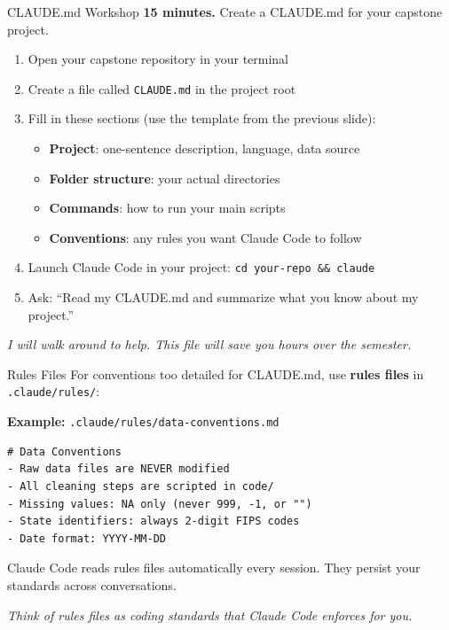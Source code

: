 \begin{frame}{CLAUDE.md Workshop}
  \textbf{\textcolor{usfgreen}{15 minutes.}} Create a CLAUDE.md for your capstone project.

  \vspace{6pt}

  \begin{enumerate}
    \item Open your capstone repository in your terminal
    \item Create a file called \texttt{CLAUDE.md} in the project root
    \item Fill in these sections (use the template from the previous slide):
    \begin{itemize}
      \item \textbf{Project}: one-sentence description, language, data source
      \item \textbf{Folder structure}: your actual directories
      \item \textbf{Commands}: how to run your main scripts
      \item \textbf{Conventions}: any rules you want Claude Code to follow
    \end{itemize}
    \item Launch Claude Code in your project: \texttt{cd your-repo \&\& claude}
    \item Ask: ``Read my CLAUDE.md and summarize what you know about my project.''
  \end{enumerate}

  \vspace{4pt}

  \textit{I will walk around to help. This file will save you hours over the semester.}
\end{frame}

\begin{frame}[fragile]{Rules Files}
  For conventions too detailed for CLAUDE.md, use \textbf{rules files} in \texttt{.claude/rules/}:

  \vspace{4pt}

  \textbf{Example:} \texttt{.claude/rules/data-conventions.md}

\begin{lstlisting}[style=terminal, basicstyle=\ttfamily\footnotesize\color{darkgray}]
# Data Conventions
- Raw data files are NEVER modified
- All cleaning steps are scripted in code/
- Missing values: NA only (never 999, -1, or "")
- State identifiers: always 2-digit FIPS codes
- Date format: YYYY-MM-DD
\end{lstlisting}

  \vspace{4pt}

  Claude Code reads rules files automatically every session. They persist your standards across conversations.

  \vspace{4pt}

  \textit{Think of rules files as coding standards that Claude Code enforces for you.}
\end{frame}

